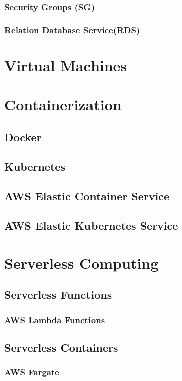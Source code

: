 \subsection*{Security Groups (SG)}
\subsection*{Relation Database Service(RDS)}

\chapter{Virtual Machines}

\chapter{Containerization}
\section{Docker}
\section{Kubernetes}
\section{AWS Elastic Container Service}
\section{AWS Elastic Kubernetes Service}

\chapter{Serverless Computing}
\section{Serverless Functions}
\subsection{AWS Lambda Functions}
\section{Serverless Containers}
\subsection{AWS Fargate}

